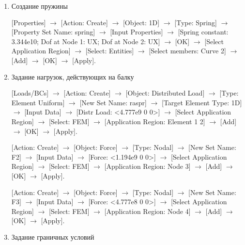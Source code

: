 \begin{enumerate}
    [Properties] $\rightarrow$ [1D Properties] $\rightarrow$ [Beam] $\rightarrow$ [Action: Create] $\rightarrow$ [Object: 1D] $\rightarrow$ [Type: Beam] $\rightarrow$ [Property Set Name: bar] $\rightarrow$ [Input Properties] $\rightarrow$ [Section name: section; Material Name: aluminium; Bar Orientation: <0 1 0>] $\rightarrow$ [OK] $\rightarrow$ [Select Application Region] $\rightarrow$ [Select: Entities] $\rightarrow$ [Select members: Curve 1] $\rightarrow$ [Add] $\rightarrow$ [OK] $\rightarrow$ [Apply].

    \item Создание пружины
    
    [Properties] $\rightarrow$ [Action: Create] $\rightarrow$ [Object: 1D] $\rightarrow$ [Type: Spring] $\rightarrow$ [Property Set Name: spring] $\rightarrow$ [Input Properties] $\rightarrow$ [Spring constant: 3.344e10; Dof at Node 1: UX; Dof at Node 2: UX] $\rightarrow$ [OK] $\rightarrow$ [Select Application Region] $\rightarrow$ [Select: Entities] $\rightarrow$ [Select members: Curve 2] $\rightarrow$ [Add] $\rightarrow$ [OK] $\rightarrow$ [Apply].

    \item Задание нагрузок, действующих на балку
    
    [Loads/BCs] $\rightarrow$ [Action: Create] $\rightarrow$ [Object: Distributed Load] $\rightarrow$ [Type: Element Uniform] $\rightarrow$ [New Set Name: raspr] $\rightarrow$ [Target Element Type: 1D] $\rightarrow$ [Input Data] $\rightarrow$ [Distr Load: <4.777e9 0 0>] $\rightarrow$ [Select Application Region] $\rightarrow$ [Select: FEM] $\rightarrow$ [Application Region: Element 1 2] $\rightarrow$ [Add] $\rightarrow$ [OK] $\rightarrow$ [Apply].

    [Action: Create] $\rightarrow$ [Object: Force] $\rightarrow$ [Type: Nodal] $\rightarrow$ [New Set Name: F2] $\rightarrow$ [Input Data] $\rightarrow$ [Force: <1.194e9 0 0>] $\rightarrow$ [Select Application Region] $\rightarrow$ [Select: FEM] $\rightarrow$ [Application Region: Node 3] $\rightarrow$ [Add] $\rightarrow$ [OK] $\rightarrow$ [Apply].

    [Action: Create] $\rightarrow$ [Object: Force] $\rightarrow$ [Type: Nodal] $\rightarrow$ [New Set Name: F3] $\rightarrow$ [Input Data] $\rightarrow$ [Force: <4.777e8 0 0>] $\rightarrow$ [Select Application Region] $\rightarrow$ [Select: FEM] $\rightarrow$ [Application Region: Node 4] $\rightarrow$ [Add] $\rightarrow$ [OK] $\rightarrow$ [Apply].

    \item Задание граничных условий
    

\end{enumerate}
